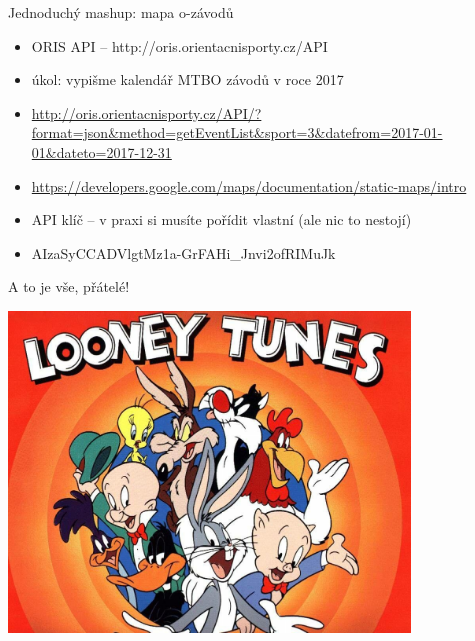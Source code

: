 \documentclass{beamer}
\begin{document}
\begin{frame}{Jednoduchý mashup: mapa o-závodů}
  \begin{itemize}
    \item ORIS API -- http://oris.orientacnisporty.cz/API
    \item úkol: vypišme kalendář MTBO závodů v roce 2017
    \item {\tiny \url{http://oris.orientacnisporty.cz/API/?format=json\&method=getEventList\&sport=3\&datefrom=2017-01-01\&dateto=2017-12-31}}
    \item {\tiny \url{https://developers.google.com/maps/documentation/static-maps/intro}}
    \item API klíč -- v praxi si musíte pořídit vlastní (ale nic to nestojí)
    \item AIzaSyCCADVlgtMz1a-GrFAHi\_Jnvi2ofRIMuJk
  \end{itemize}
\end{frame}


\begin{frame}{A to je vše, přátelé!}
  \begin{center}
    \includegraphics[width=0.8\textwidth]{looney_tunes}
  \end{center}
\end{frame}
\end{document}
